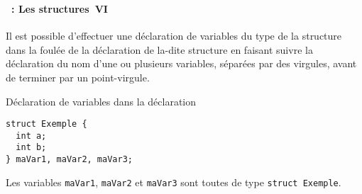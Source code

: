 \begin{frame}[containsverbatim]
  \frametitle{\secname}
  \framesubtitle{\subsecname~: Les structures~VI} 

  Il est possible d'effectuer une déclaration de variables du type de la structure dans la foulée de la déclaration
  de la-dite structure en faisant suivre la déclaration du nom d'une ou plusieurs variables, séparées par des 
  virgules, avant de terminer par un point-virgule.
  \vspace{0.3cm}
  \begin{exampleblock}{Déclaration de variables dans la déclaration}
    \begin{verbatim}
struct Exemple {
  int a;
  int b;
} maVar1, maVar2, maVar3;\end{verbatim}
  \end{exampleblock}
  \vspace{0.3cm}
  \par
  Les variables \verb|maVar1|, \verb|maVar2| et \verb|maVar3| sont toutes de type \verb|struct Exemple|.
\end{frame}

